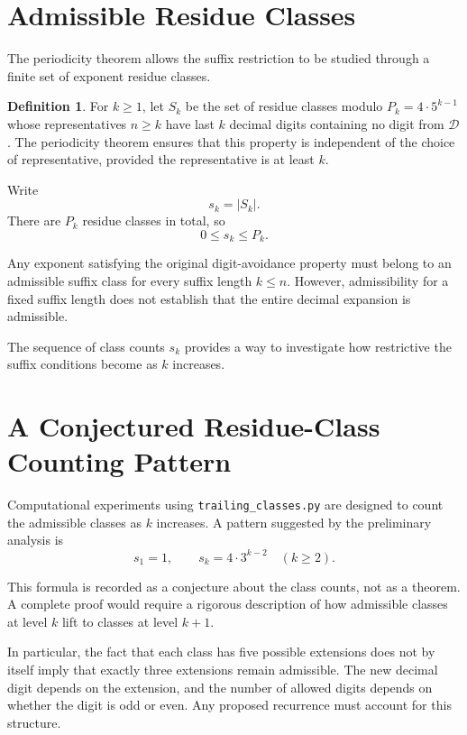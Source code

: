 \documentclass[11pt,a4paper]{article}
\theoremstyle{definition}
\newtheorem{definition}{Definition}[section]
\theoremstyle{plain}
\theoremstyle{remark}
\newcommand{\forbidden}{\mathcal{D}}
\begin{document}
\section{Admissible Residue Classes}

The periodicity theorem allows the suffix restriction to be
studied through a finite set of exponent residue classes.

\begin{definition}
For \(k\geq1\), let \(S_k\) be the set of residue classes
modulo \(P_k=4\cdot5^{k-1}\) whose representatives \(n\geq k\)
have last \(k\) decimal digits containing no digit from
\(\forbidden\). The periodicity theorem ensures that this
property is independent of the choice of representative,
provided the representative is at least \(k\).
\end{definition}

Write
\[
s_k=\lvert S_k\rvert.
\]
There are \(P_k\) residue classes in total, so
\[
0\leq s_k\leq P_k.
\]

Any exponent satisfying the original digit-avoidance property
must belong to an admissible suffix class for every suffix length
\(k\leq n\). However, admissibility for a fixed suffix length
does not establish that the entire decimal expansion is admissible.

The sequence of class counts \(s_k\) provides a way to investigate
how restrictive the suffix conditions become as \(k\) increases.

\section{A Conjectured Residue-Class Counting Pattern}

Computational experiments using \texttt{trailing\_classes.py}
are designed to count the admissible classes as \(k\) increases.
A pattern suggested by the preliminary analysis is
\[
s_1=1,\qquad
s_k=4\cdot3^{k-2}\quad(k\geq2).
\]

This formula is recorded as a conjecture about the class counts,
not as a theorem. A complete proof would require a rigorous
description of how admissible classes at level \(k\) lift to
classes at level \(k+1\).

In particular, the fact that each class has five possible
extensions does not by itself imply that exactly three extensions
remain admissible. The new decimal digit depends on the extension,
and the number of allowed digits depends on whether the digit
is odd or even. Any proposed recurrence must account for this
structure.
\end{document}
